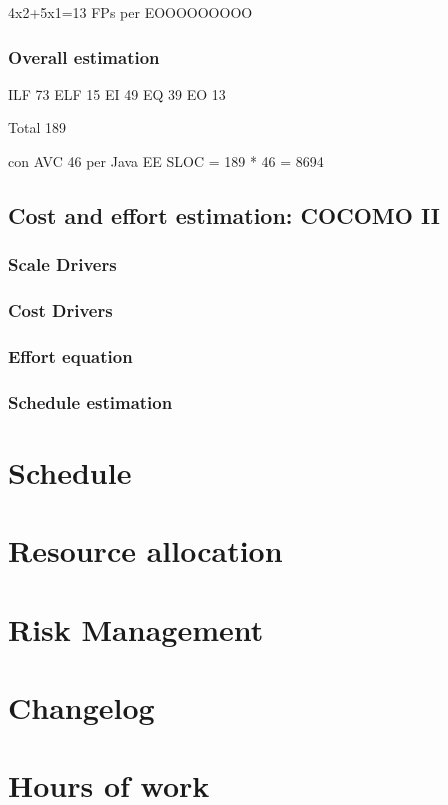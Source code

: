 \documentclass[english]{article}
\begin{document}
4x2+5x1=13 FPs per EOOOOOOOOO

\subsubsection{Overall estimation}

ILF 73
ELF 15
EI 49
EQ 39
EO 13

Total 189

con AVC 46 per Java EE
SLOC = 189 * 46 = 8694


\subsection{Cost and effort estimation: COCOMO II}


\subsubsection{Scale Drivers}

\subsubsection{Cost Drivers}

\subsubsection{Effort equation}

\subsubsection{Schedule estimation}


\section{Schedule}


\section{Resource allocation}


\section{Risk Management}

\appendix

\section{Changelog}

\section{Hours of work}
\end{document}
